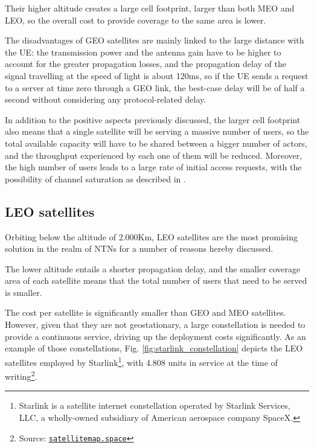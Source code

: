 Their higher altitude creates a large cell footprint, larger than both \ac{MEO} and \ac{LEO}, so the overall cost to provide coverage to the same area is lower.

The disadvantages of \ac{GEO} satellites are mainly linked to the large distance with the \ac{UE}: the transmission power and the antenna gain have to be higher to account for the greater propagation losses, and the propagation delay of the signal travelling at the speed of light is about 120ms, so if the \ac{UE} sends a request to a server at time zero through a \ac{GEO} link, the best-case delay will be of half a second without considering any protocol-related delay.

In addition to the positive aspects previously discussed, the larger cell footprint also means that a single satellite will be serving a massive number of users, so the total available capacity will have to be shared between a bigger number of actors, and the throughput experienced by each one of them will be reduced. 
Moreover, the high number of users leads to a large rate of initial access  requests, with the possibility of channel saturation as described in \cite{3gpp-tr-38.811}.

\subsection{LEO satellites}
Orbiting below the altitude of 2.000Km, \ac{LEO} satellites are the most promising solution in the realm of \ac{NTNs} for a number of reasons hereby discussed.
    
The lower altitude entails a shorter propagation delay, and the smaller coverage area of each satellite means that the total number of users that need to be served is smaller. 

The cost per satellite is significantly smaller than \ac{GEO} and \ac{MEO} satellites. However, given that they are not geostationary, a large constellation is needed to provide a continuous service, driving up the deployment costs significantly. As an example of those constellations, Fig. \ref{fig:starlink_constellation} depicts the \ac{LEO} satellites employed by Starlink\footnote{Starlink is a satellite internet constellation operated by Starlink Services, LLC, a wholly-owned subsidiary of American aerospace company SpaceX.}, with 4.808 units in service at the time of writing\footnote{Source: \href{https://satellitemap.space/}{\texttt{satellitemap.space}}}.

